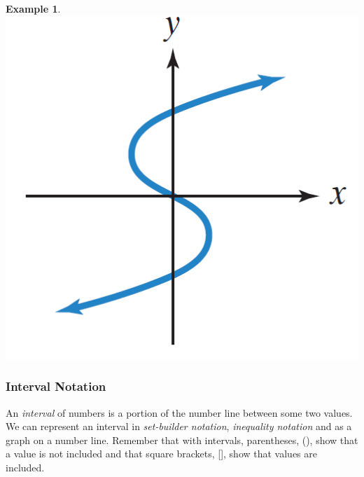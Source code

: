 \documentclass[addpoints,12pt]{exam}
\theoremstyle{definition}
\newtheorem{example}{Example}[subsection]
\begin{document}
\begin{example}
\begin{minipage}{.33\textwidth}
\end{minipage}%
\begin{minipage}{.33\textwidth}
\includegraphics[scale=.4]{images/vert_line_test_03}
\end{minipage}%
\end{example}

\vspace{.5in}

\subsubsection*{Interval Notation}

An \emph{interval} of numbers is a portion of the number line between some two values. We can represent an interval in \emph{set-builder notation}, \emph{inequality notation} and as a graph on a number line. Remember that with intervals, parentheses, (), show that a value is not included and that square brackets, [], show that values are included.

\newpage
\end{document}
